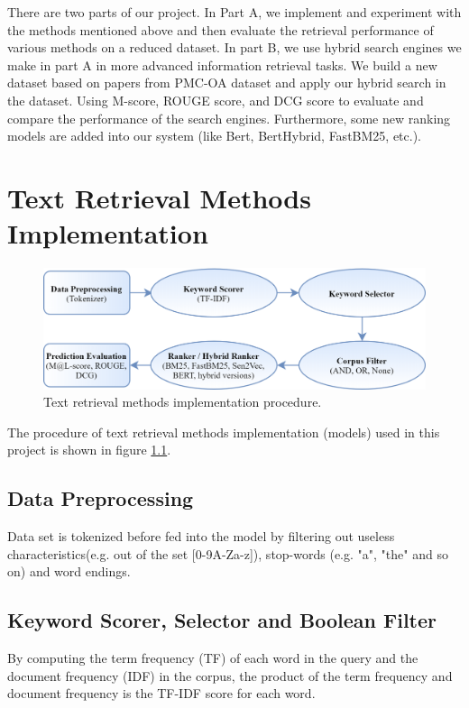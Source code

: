 \documentclass[10pt,a4paper,fleqn]{report}
\begin{document}
		There are two parts of our project.
		In Part A, we implement and experiment with the methods mentioned above and then evaluate the retrieval performance of various methods on a reduced dataset.
		In part B, we use hybrid search engines we make in part A in more advanced information retrieval tasks. We build a new dataset based on papers from PMC-OA dataset and apply our hybrid search in the dataset. Using M-score, ROUGE score, and DCG score to evaluate and compare the performance of the search engines. Furthermore, some new ranking models are added into our system (like Bert, BertHybrid, FastBM25, etc.).
		
\chapter{Text Retrieval Methods Implementation}			


	\begin{figure}[htbp]
		\centering
		\includegraphics[width=\textwidth]{figure/Implementation procedure.png}			
		\caption[]{Text retrieval methods implementation procedure.}
		\label{fig: implementation_procedure}
	\end{figure}
	
	The procedure of text retrieval methods implementation (models) used in this project is shown in figure \ref{fig: implementation_procedure}.
	
	\section{Data Preprocessing}
	Data set is tokenized before fed into the model by filtering out useless characteristics(e.g. out of the set [0-9A-Za-z]), stop-words (e.g.  "a", "the" and so on) and word endings.
	
	\section{Keyword Scorer, Selector and Boolean Filter}
	By computing the term frequency (TF) of each word in the query and the document frequency (IDF) in the corpus, the product of the term frequency and document frequency is the TF-IDF score for each word. 
	
\end{document}

